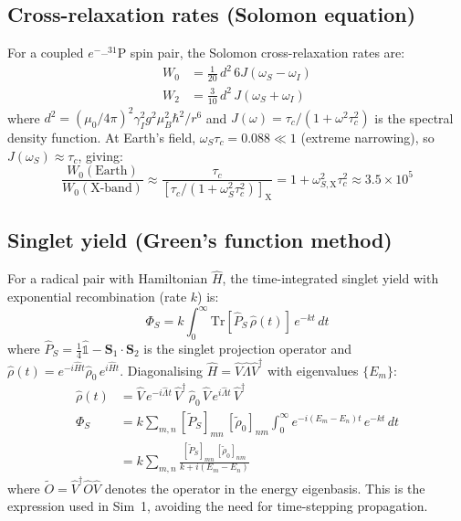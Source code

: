 \documentclass[11pt]{article}
\begin{document}
\subsection{Cross-relaxation rates (Solomon equation)}

For a coupled $e^-$--$^{31}$P spin pair, the Solomon cross-relaxation rates are\cite{Solomon1955}:
\begin{align}
W_0 &= \frac{1}{20}\,d^2\,6J(\omega_S - \omega_I) \label{eq:W0}\\
W_2 &= \frac{3}{10}\,d^2\,J(\omega_S + \omega_I) \label{eq:W2}
\end{align}
where $d^2 = (\mu_0/4\pi)^2 \gamma_I^2 g^2 \mu_B^2 \hbar^2 / r^6$ and $J(\omega) = \tau_c/(1 + \omega^2\tau_c^2)$ is the spectral density function. At Earth's field, $\omega_S\tau_c = 0.088 \ll 1$ (extreme narrowing), so $J(\omega_S) \approx \tau_c$, giving:
\begin{equation}
\frac{W_0(\mathrm{Earth})}{W_0(\mathrm{X\text{-}band})} \approx \frac{\tau_c}{[\tau_c/(1 + \omega_S^2\tau_c^2)]_\mathrm{X}} = 1 + \omega_{S,\mathrm{X}}^2\tau_c^2 \approx 3.5 \times 10^5
\end{equation}

\subsection{Singlet yield (Green's function method)}

For a radical pair with Hamiltonian $\hat{H}$, the time-integrated singlet yield with exponential recombination (rate $k$) is\cite{Haberkorn1976}:
\begin{equation}
\Phi_S = k\int_0^\infty \mathrm{Tr}[\hat{P}_S\,\hat{\rho}(t)]\,e^{-kt}\,dt
\end{equation}
where $\hat{P}_S = \frac{1}{4}\hat{\mathbb{1}} - \mathbf{S}_1 \cdot \mathbf{S}_2$ is the singlet projection operator and $\hat{\rho}(t) = e^{-i\hat{H}t}\hat{\rho}_0\,e^{i\hat{H}t}$. Diagonalising $\hat{H} = \hat{V}\hat{\Lambda}\hat{V}^\dagger$ with eigenvalues $\{E_m\}$:
\begin{align}
\hat{\rho}(t) &= \hat{V}\,e^{-i\hat{\Lambda}t}\,\hat{V}^\dagger\,\hat{\rho}_0\,\hat{V}\,e^{i\hat{\Lambda}t}\,\hat{V}^\dagger \\
\Phi_S &= k\sum_{m,n} [\tilde{P}_S]_{mn}\,[\tilde{\rho}_0]_{nm} \int_0^\infty e^{-i(E_m-E_n)t}\,e^{-kt}\,dt \\
&= k\sum_{m,n} \frac{[\tilde{P}_S]_{mn}\,[\tilde{\rho}_0]_{nm}}{k + i(E_m - E_n)} \label{eq:SPhiS}
\end{align}
where $\tilde{O} = \hat{V}^\dagger\hat{O}\hat{V}$ denotes the operator in the energy eigenbasis. This is the expression used in Sim~1, avoiding the need for time-stepping propagation.
\end{document}
